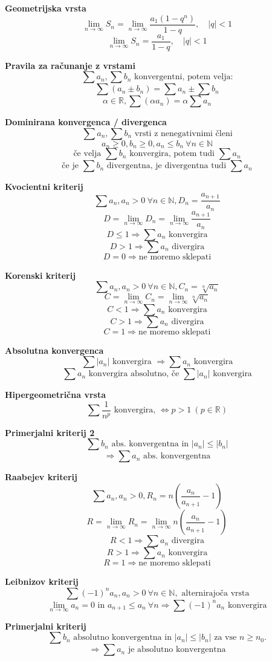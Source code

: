 \textbf{Geometrijska vrsta}
\[
\lim_{n \to \infty} S_n = \lim_{n \to \infty} \frac{a_1(1-q^n)}{1-q}, \quad |q|<1
\]
\[
\lim_{n \to \infty} S_n = \frac{a_1}{1-q}, \quad |q|<1
\]

\textbf{Pravila za računanje z vrstami}
\[
\sum a_n, \sum b_n \text{ konvergentni, potem velja:}
\]
\[
\sum (a_n \pm b_n) = \sum a_n \pm \sum b_n
\]
\[
\alpha \in \mathbb{R}, \sum (\alpha a_n) = \alpha \sum a_n
\]

\textbf{Dominirana konvergenca / divergenca}
\[
\sum a_n, \sum b_n \text{ vrsti z nenegativnimi členi}
\]
\[
a_n \geq 0, b_n \geq 0, a_n \leq b_n \ \forall n \in \mathbb{N}
\]
\[
\text{če velja } \sum b_n \text{ konvergira, potem tudi } \sum a_n
\]
\[
\text{če je } \sum b_n \text{ divergentna, je divergentna tudi } \sum a_n
\]

\textbf{Kvocientni kriterij}
\[
\sum a_n, a_n>0 \ \forall n \in \mathbb{N}, D_n = \frac{a_{n+1}}{a_n}
\]
\[
D = \lim_{n \to \infty} D_n = \lim_{n \to \infty} \frac{a_{n+1}}{a_n}
\]
\[
D \leq 1 \Rightarrow \sum a_n \text{ konvergira}
\]
\[
D > 1 \Rightarrow \sum a_n \text{ divergira}
\]
\[
D = 0 \Rightarrow \text{ne moremo sklepati}
\]

\textbf{Korenski kriterij}
\[
\sum a_n, a_n>0 \ \forall n \in \mathbb{N}, C_n = \sqrt[n]{a_n}
\]
\[
C = \lim_{n \to \infty} C_n = \lim_{n \to \infty} \sqrt[n]{a_n}
\]
\[
C < 1 \Rightarrow \sum a_n \text{ konvergira}
\]
\[
C > 1 \Rightarrow \sum a_n \text{ divergira}
\]
\[
C = 1 \Rightarrow \text{ne moremo sklepati}
\]

\textbf{Absolutna konvergenca}
\[
\sum |a_n| \text{ konvergira } \Rightarrow \sum a_n \text{ konvergira}
\]
\[
\sum a_n \text{ konvergira absolutno, če } \sum |a_n| \text{ konvergira}
\]

\textbf{Hipergeometrična vrsta}
\[
\sum \frac{1}{n^p} \text{ konvergira, } \Leftrightarrow p>1 \ (p \in \mathbb{R})
\]

\textbf{Primerjalni kriterij 2}
\[
\sum b_n \text{ abs. konvergentna in } |a_n| \leq |b_n|
\]
\[
\Rightarrow \sum a_n \text{ abs. konvergentna}
\]

\textbf{Raabejev kriterij}
\[
\sum a_n, a_n>0, R_n = n \left( \frac{a_n}{a_{n+1}} - 1 \right)
\]
\[
R = \lim_{n \to \infty} R_n = \lim_{n \to \infty} n \left( \frac{a_n}{a_{n+1}} - 1 \right)
\]
\[
R < 1 \Rightarrow \sum a_n \text{ divergira}
\]
\[
R > 1 \Rightarrow \sum a_n \text{ konvergira}
\]
\[
R = 1 \Rightarrow \text{ne moremo sklepati}
\]

\textbf{Leibnizov kriterij}
\[
\sum (-1)^n a_n, a_n>0 \ \forall n \in \mathbb{N}, \text{ alternirajoča vrsta}
\]
\[
\lim_{n \to \infty} a_n = 0 \text{ in } a_{n+1} \leq a_n \ \forall n \Rightarrow \sum (-1)^n a_n \text{ konvergira}
\]

\textbf{Primerjalni kriterij}
\[
\sum b_n \text{ absolutno konvergentna in } |a_n| \leq |b_n| \text{ za vse } n \geq n_0.
\]
\[
\Rightarrow \sum a_n \text{ je absolutno konvergentna}
\]
